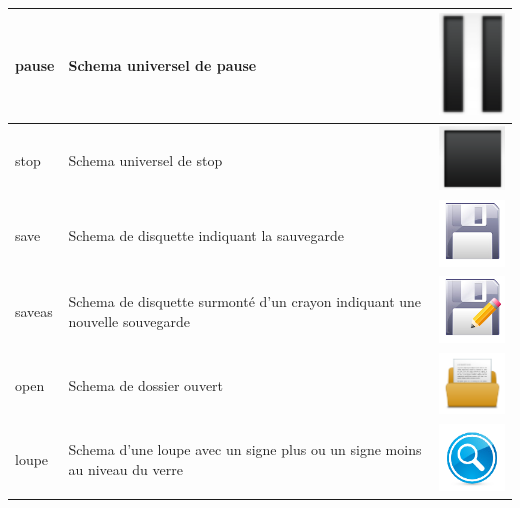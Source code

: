 \begin{longtable}{|m{3cm}|m{9cm}|m{2.5cm}|}
\hline
pause  & Schema universel de pause & \includegraphics[width=2.5cm]{img/pause.png} \\
\hline
stop  & Schema universel de stop & \includegraphics[width=2.5cm]{img/stop.png} \\
\hline
save  & Schema de disquette indiquant la sauvegarde & \includegraphics[width=2.5cm]{img/save.png} \\
\hline
saveas  & Schema de disquette surmonté d'un crayon indiquant une nouvelle souvegarde & \includegraphics[width=2.5cm]{img/saveas.png} \\
\hline
open  & Schema de dossier ouvert & \includegraphics[width=2.5cm]{img/open.png} \\
\hline
loupe  & Schema d'une loupe avec un signe plus ou un signe moins au niveau du verre & \includegraphics[width=2.5cm]{img/loupe.png} \\

\end{longtable}
